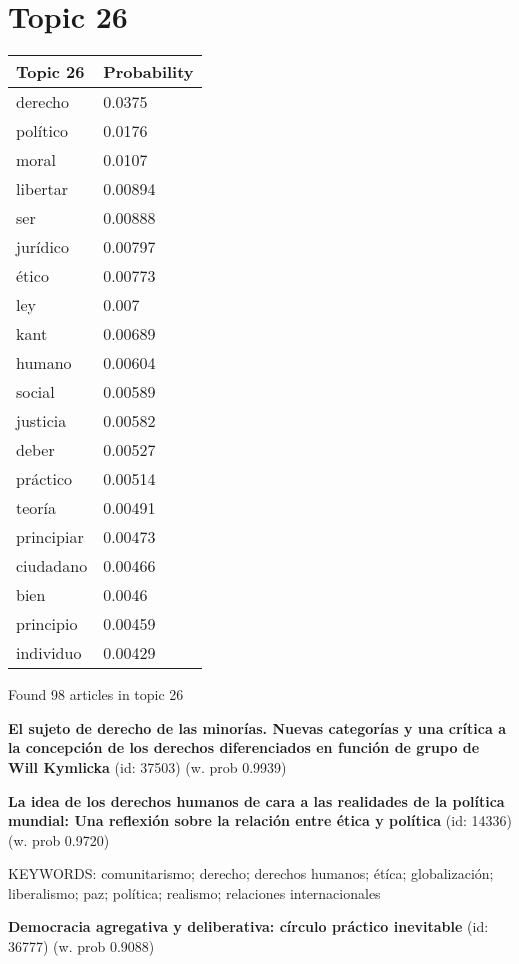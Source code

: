 \documentclass{article}
\begin{document}
\section*{Topic 26}\vfill
\begin{tabular}{ll}
\toprule
   Topic 26 & Probability \\
\midrule
    derecho &      0.0375 \\
   político &      0.0176 \\
      moral &      0.0107 \\
   libertar &     0.00894 \\
        ser &     0.00888 \\
   jurídico &     0.00797 \\
      ético &     0.00773 \\
        ley &       0.007 \\
       kant &     0.00689 \\
     humano &     0.00604 \\
     social &     0.00589 \\
   justicia &     0.00582 \\
      deber &     0.00527 \\
   práctico &     0.00514 \\
     teoría &     0.00491 \\
 principiar &     0.00473 \\
  ciudadano &     0.00466 \\
       bien &      0.0046 \\
  principio &     0.00459 \\
  individuo &     0.00429 \\
\bottomrule
\end{tabular}

\vfill
Found 98 articles in topic 26
\vfill

\textbf{El sujeto de derecho de las minorías. Nuevas categorías y una crítica a la concepción de los derechos diferenciados en función de grupo de Will Kymlicka} (id: 37503)
 (w. prob 0.9939)
\vfill

\textbf{La idea de los derechos humanos de cara a las realidades de la política mundial: Una reflexión sobre la relación entre ética y política} (id: 14336)
 (w. prob 0.9720)


KEYWORDS:
comunitarismo; derecho; derechos humanos; étíca; globalización; liberalismo; paz; política; realismo; relaciones internacionales
\vfill

\textbf{Democracia agregativa y deliberativa: círculo práctico inevitable} (id: 36777)
 (w. prob 0.9088)
\end{document}
